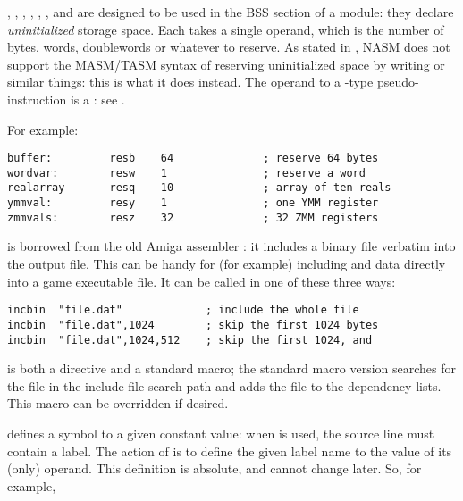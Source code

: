, , , ,
, ,  and 
are designed to be used in the BSS section of a module: they declare
\emph{uninitialized} storage space. Each takes a single operand, which is
the number of bytes, words, doublewords or whatever to reserve. As stated
in , NASM does not support the MASM/TASM syntax of
reserving uninitialized space by writing  or similar
things: this is what it does instead. The operand to a -type
pseudo-instruction is a :
see .

For example:

\begin{lstlisting}
buffer:         resb    64              ; reserve 64 bytes
wordvar:        resw    1               ; reserve a word
realarray       resq    10              ; array of ten reals
ymmval:         resy    1               ; one YMM register
zmmvals:        resz    32              ; 32 ZMM registers
\end{lstlisting}


 is borrowed from the old Amiga assembler :
it includes a binary file verbatim into the output file. This can be handy
for (for example) including  and  data
directly into a game executable file. It can be called in one of these
three ways:

\begin{lstlisting}
incbin  "file.dat"             ; include the whole file
incbin  "file.dat",1024        ; skip the first 1024 bytes
incbin  "file.dat",1024,512    ; skip the first 1024, and
\end{lstlisting}

 is both a directive and a standard macro; the standard
macro version searches for the file in the include file search path
and adds the file to the dependency lists. This macro can be
overridden if desired.


 defines a symbol to a given constant value: when  is
used, the source line must contain a label. The action of  is
to define the given label name to the value of its (only) operand.
This definition is absolute, and cannot change later. So, for
example,

